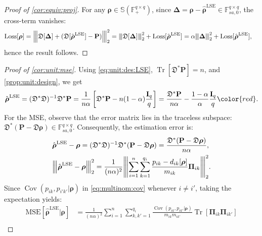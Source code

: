 \documentclass[noinfoline]{imsart}\setcounter{tocdepth}{2}
\renewcommand{\b}[1]{\mathbb{#1}} %
\newcommand{\m}[1]{\mathbf{#1}} %
\newcommand{\f}[1]{\mathfrak{#1}} %
\newcommand{\mb}[1]{\boldsymbol{#1}} %
\newcommand{\tr}[1]{\operatorname{Tr}\left[#1\right]}
\newcommand{\vertiii}[1]{{\left\vert\kern-0.25ex\left\vert\kern-0.25ex\left\vert #1 
    \right\vert\kern-0.25ex\right\vert\kern-0.25ex\right\vert}} %
\newcommand{\Cov}{\operatorname{Cov}}
\theoremstyle{plain}
\begin{document}
\begin{appendix}
\begin{proof}[Proof of \cref{cor:equiv:proj}]
For any $\mb{\rho} \in \b{S}(\b{F}_{+}^{q \times q})$, since $\mb{\Delta} = \mb{\rho} - \hat{\mb{\rho}}^{\text{LSE}} \in \b{F}_{sa, 0}^{q \times q}$, the cross-term vanishes:
\begin{align*}
    \mathrm{Loss}[\mb{\rho}] = \vertiii{\f{D}[\mb{\Delta}] + (\f{D}[\hat{\mb{\rho}}^{\text{LSE}}] - \m{P})}_{2}^{2} &= \vertiii{\f{D}[\mb{\Delta}]}_{2}^{2} + \mathrm{Loss}[\hat{\mb{\rho}}^{\text{LSE}}] = \alpha \vertiii{\mb{\Delta}}_{2}^{2} + \mathrm{Loss}[\hat{\mb{\rho}}^{\text{LSE}}],
\end{align*}
hence the result follows.
\end{proof}


\begin{proof}[Proof of \cref{cor:unit:mse}]
Using \eqref{eq:unit:des:LSE}, $\tr{\f{D}^{*} \m{P}} = n$, and \cref{prop:unit:design}, we get
\begin{align*}
    \hat{\mb{\rho}}^{\text{LSE}} = (\f{D}^{*} \f{D})^{-1} \f{D}^{*} \m{P} = \frac{1}{n \alpha} \left[ \f{D}^{*} \m{P} - n (1-\alpha) \frac{\m{I}_{q}}{q} \right] = \frac{\f{D}^{*} \m{P}}{n \alpha} - \frac{1-\alpha}{\alpha} \frac{\m{I}_{q}}{q}{\color{red}.}
\end{align*}
For the MSE, observe that the error matrix lies in the traceless subspace: $\f{D}^{*} (\m{P} - \f{D} \mb{\rho}) \in \b{F}_{sa, 0}^{q \times q}$.
Consequently, the estimation error is:
\begin{align*}
    &\hat{\mb{\rho}}^{\text{LSE}} - \mb{\rho} = (\f{D}^{*} \f{D})^{-1} \f{D}^{*} (\m{P} - \f{D} \mb{\rho}) = \frac{\f{D}^{*} (\m{P} - \f{D} \mb{\rho})}{n\alpha}, \\
    &\vertiii{\hat{\mb{\rho}}^{\text{LSE}} - \mb{\rho}}_{2}^{2} =
    \frac{1}{(n \alpha)^{2}} \vertiii{ \sum_{i=1}^{n} \sum_{k=1}^{q_{i}} \frac{p_{ik} - d_{ik}[\mb{\rho}]}{m_{ik}} \m{\Pi}_{ik} }_{2}^{2}.
\end{align*}
Since $\Cov (p_{ik}, p_{i'k'} \vert \mb{\rho})$ in \eqref{eq:multinom:cov} whenever $i \ne i'$, taking the expectation yields:
\begin{align*}
    \mathrm{MSE}[\hat{\mb{\rho}}^{\text{LSE}} \vert \mb{\rho}] 
    &= \frac{1}{(n \alpha)^{2}} \sum_{i=1}^{n} \sum_{k, k'=1}^{q_{i}} \frac{\Cov (p_{ik}, p_{ik'} \vert \mb{\rho})}{m_{ik} m_{ik'}} \tr{\m{\Pi}_{ik} \m{\Pi}_{ik'}} \\

\end{align*}
\end{proof}
\end{appendix}
\end{document}
